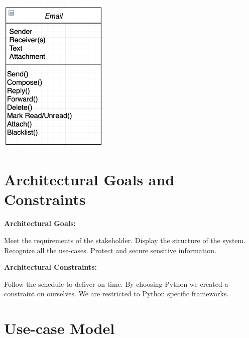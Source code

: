 \documentclass{article}
\begin{document}
\begin{center}
\includegraphics[width=200px, keepaspectratio]{Class_Diagram.png}\\[1cm]
\end{center}

\newpage

\section*{Architectural Goals and Constraints}
\begin{flushleft}
\textbf{Architectural Goals:}\\ 

\end{flushleft}
\begin{outline}
    \1 Meet the requirements of the stakeholder.  
    \1 Display the structure of the system.
    \1 Recognize all the use-cases.
    \1 Protect and secure sensitive information. 
\end{outline}
\begin{flushleft}
\textbf{Architectural Constraints:}\\ 

\end{flushleft}
\begin{outline}
    \1 Follow the schedule to deliver on time.
    \1 By choosing Python we created a constraint on ourselves. We are restricted to Python specific frameworks.
\end{outline}

\newpage

\section*{Use-case Model}
\end{document}
